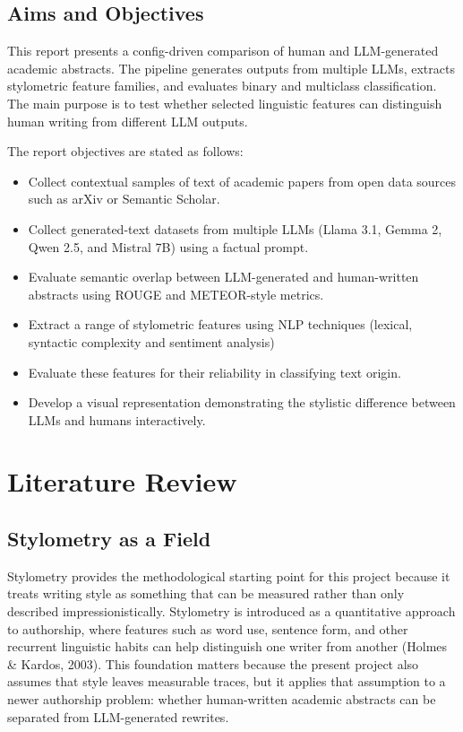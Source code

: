 \documentclass[12pt,a4paper]{article}
\begin{document}
\subsection{Aims and Objectives}

This report presents a config-driven comparison of human and LLM-generated academic abstracts. The pipeline generates outputs from multiple LLMs, extracts stylometric feature families, and evaluates binary and multiclass classification. The main purpose is to test whether selected linguistic features can distinguish human writing from different LLM outputs.

The report objectives are stated as follows:

\begin{itemize}
    \item Collect contextual samples of text of academic papers from open data sources such as arXiv or Semantic Scholar.
    \item Collect generated-text datasets from multiple LLMs (Llama 3.1, Gemma 2, Qwen 2.5, and Mistral 7B) using a factual prompt.
    \item Evaluate semantic overlap between LLM-generated and human-written abstracts using ROUGE and METEOR-style metrics.
    \item Extract a range of stylometric features using NLP techniques (lexical, syntactic complexity and sentiment analysis)
    \item Evaluate these features for their reliability in classifying text origin.
    \item Develop a visual representation demonstrating the stylistic difference between LLMs and humans interactively.
\end{itemize}

\section{Literature Review}

\subsection{Stylometry as a Field}

Stylometry provides the methodological starting point for this project because it treats writing style as something that can be measured rather than only described impressionistically. Stylometry is introduced as a quantitative approach to authorship, where features such as word use, sentence form, and other recurrent linguistic habits can help distinguish one writer from another (Holmes \& Kardos, 2003). This foundation matters because the present project also assumes that style leaves measurable traces, but it applies that assumption to a newer authorship problem: whether human-written academic abstracts can be separated from LLM-generated rewrites.
\end{document}
